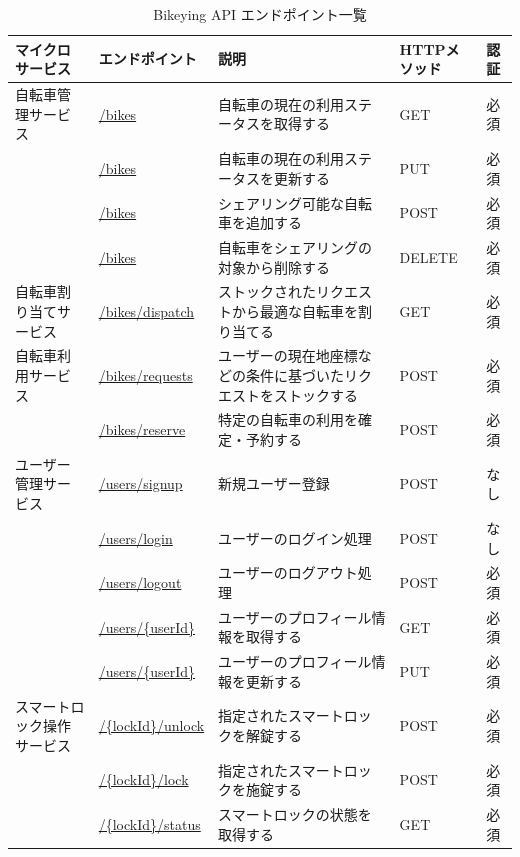           \begin{table}[t]
            \caption{Bikeying API エンドポイント一覧}
            \label{tab:Bikeying API エンドポイント一覧}
            \centering
            \begin{tabular}{|p{3.5cm}|l|p{5cm}|l|l|} \hline
              マイクロサービス & エンドポイント & 説明 & HTTPメソッド & 認証 \\ \hline
              自転車管理サービス & \url{/bikes} & 自転車の現在の利用ステータスを取得する & GET & 必須 \\ \cline{2-5}
              & \url{/bikes} & 自転車の現在の利用ステータスを更新する & PUT & 必須 \\ \cline{2-5}
              & \url{/bikes} & シェアリング可能な自転車を追加する & POST & 必須 \\ \cline{2-5}
              & \url{/bikes} & 自転車をシェアリングの対象から削除する & DELETE & 必須 \\ \hline
              自転車割り当てサービス & \url{/bikes/dispatch} & ストックされたリクエストから最適な自転車を割り当てる & GET & 必須 \\ \hline
              自転車利用サービス & \url{/bikes/requests} & ユーザーの現在地座標などの条件に基づいたリクエストをストックする & POST & 必須 \\ \cline{2-5}
              & \url{/bikes/reserve} & 特定の自転車の利用を確定・予約する & POST & 必須 \\ \hline
              ユーザー管理サービス & \url{/users/signup} & 新規ユーザー登録 & POST & なし \\ \cline{2-5}
              & \url{/users/login} & ユーザーのログイン処理 & POST & なし \\ \cline{2-5}
              & \url{/users/logout} & ユーザーのログアウト処理 & POST & 必須 \\ \cline{2-5}
              & \url{/users/{userId}} & ユーザーのプロフィール情報を取得する & GET & 必須 \\ \cline{2-5}
              & \url{/users/{userId}} & ユーザーのプロフィール情報を更新する & PUT & 必須 \\ \hline
              スマートロック操作サービス & \url{/{lockId}/unlock} & 指定されたスマートロックを解錠する & POST & 必須 \\ \cline{2-5}
              & \url{/{lockId}/lock} & 指定されたスマートロックを施錠する & POST & 必須 \\ \cline{2-5}
              & \url{/{lockId}/status} & スマートロックの状態を取得する & GET & 必須 \\ \hline
            \end{tabular}
          \end{table}

